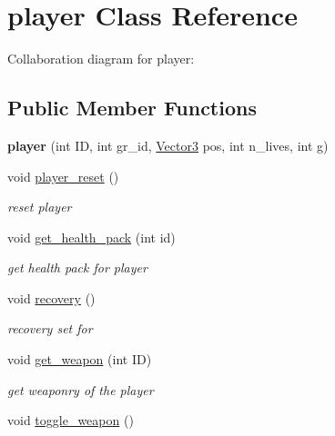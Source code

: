 \hypertarget{classplayer}{\section{player Class Reference}
\label{classplayer}
}


Collaboration diagram for player\+:
\subsection*{Public Member Functions}
\begin{DoxyCompactItemize}
\item 
\hypertarget{classplayer_a67b87ed608fa510c8da77f22d29f465a}{{\bfseries player} (int I\+D, int gr\+\_\+id, \hyperlink{class_vector3}{Vector3} pos, int n\+\_\+lives, int g)}\label{classplayer_a67b87ed608fa510c8da77f22d29f465a}

\item 
\hypertarget{classplayer_a798353d6ed384dad8a7291610ab823e6}{void \hyperlink{classplayer_a798353d6ed384dad8a7291610ab823e6}{player\+\_\+reset} ()}\label{classplayer_a798353d6ed384dad8a7291610ab823e6}

\begin{DoxyCompactList}\small\item\em reset player \end{DoxyCompactList}\item 
void \hyperlink{classplayer_a27b20eb868e9b553e5fcc90b8b6ac7a8}{get\+\_\+health\+\_\+pack} (int id)
\begin{DoxyCompactList}\small\item\em get health pack for player \end{DoxyCompactList}\item 
\hypertarget{classplayer_ab136d4362a29f8dafdac23b7aee9cbb2}{void \hyperlink{classplayer_ab136d4362a29f8dafdac23b7aee9cbb2}{recovery} ()}\label{classplayer_ab136d4362a29f8dafdac23b7aee9cbb2}

\begin{DoxyCompactList}\small\item\em recovery set for \end{DoxyCompactList}\item 
void \hyperlink{classplayer_a6da1f51b6b1bc978d4811352e5438552}{get\+\_\+weapon} (int I\+D)
\begin{DoxyCompactList}\small\item\em get weaponry of the player \end{DoxyCompactList}\item 
\hypertarget{classplayer_a788da544a1d652e999f53e3a1a328333}{void \hyperlink{classplayer_a788da544a1d652e999f53e3a1a328333}{toggle\+\_\+weapon} ()}\label{classplayer_a788da544a1d652e999f53e3a1a328333}


\end{DoxyCompactItemize}
